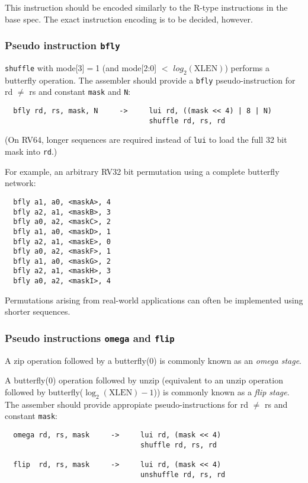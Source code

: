 

This instruction should be encoded similarly to the R-type instructions in the
base spec. The exact instruction encoding is to be decided, however.

\subsubsection{Pseudo instruction {\tt bfly}}

{\tt shuffle} with mode[3]$=$1 (and mode[2:0] $<$ $log_2(\textrm{XLEN})$) performs
a butterfly operation. The assembler should provide a {\tt bfly} pseudo-instruction
for rd $\neq$ rs and constant {\tt mask} and {\tt N}:

\begin{verbatim}
  bfly rd, rs, mask, N     ->     lui rd, ((mask << 4) | 8 | N)
                                  shuffle rd, rs, rd
\end{verbatim}

(On RV64, longer sequences are required instead of {\tt lui} to load the full
32 bit mask into {\tt rd}.)

For example, an arbitrary RV32 bit permutation using a complete butterfly network:

\begin{verbatim}
  bfly a1, a0, <maskA>, 4
  bfly a2, a1, <maskB>, 3
  bfly a0, a2, <maskC>, 2
  bfly a1, a0, <maskD>, 1
  bfly a2, a1, <maskE>, 0
  bfly a0, a2, <maskF>, 1
  bfly a1, a0, <maskG>, 2
  bfly a2, a1, <maskH>, 3
  bfly a0, a2, <maskI>, 4
\end{verbatim}

Permutations arising from real-world applications can often be implemented using
shorter sequences.

\subsubsection{Pseudo instructions {\tt omega} and {\tt flip}}

A zip operation followed by a butterfly(0) is commonly known as an {\it omega stage}.

A butterfly(0) operation followed by unzip (equivalent to an unzip operation followed
by butterfly($\log_2(\textrm{XLEN})-1$)) is commonly
known as a {\it flip stage}. The assember should provide appropiate
pseudo-instructions for rd $\neq$ rs and constant {\tt mask}:

\begin{verbatim}
  omega rd, rs, mask     ->     lui rd, (mask << 4)
                                shuffle rd, rs, rd

  flip  rd, rs, mask     ->     lui rd, (mask << 4)
                                unshuffle rd, rs, rd
\end{verbatim}


